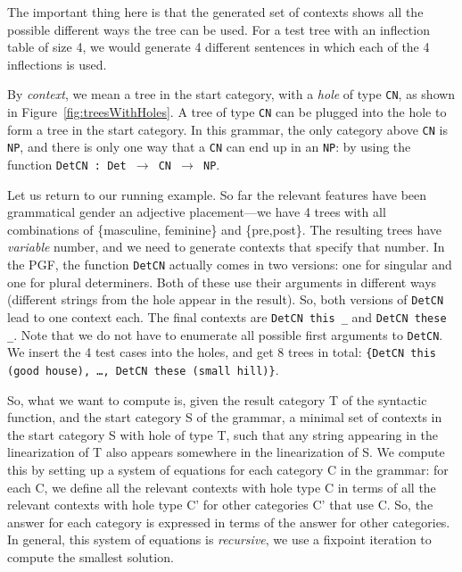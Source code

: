 \documentclass[11pt]{article}
\def\t#1{\texttt{#1}}
\begin{document}
The important thing here is that the generated set of contexts shows all the possible different ways the tree can be used. For a test tree with an inflection table of size 4, we would generate 4 different sentences in which each of the 4 inflections is used.

By \emph{context}, we mean a tree in
the start category, with a \emph{hole} of type \t{CN}, as shown in
Figure~\ref{fig:treesWithHoles}. A tree of type \t{CN} can be plugged into the hole to form a tree in the start category. In this grammar, the only category above \t{CN} is \t{NP}, and there is only
one way that a \t{CN} can end up in an \t{NP}: by using the function
\t{DetCN : Det $\rightarrow$ CN $\rightarrow$ NP}. 

Let us return to our running example. So far the relevant features have
been grammatical gender an adjective placement---we have 4 trees with
all combinations of \{masculine, feminine\} and \{pre,post\}. The
resulting trees have \emph{variable} number, and we need to generate contexts that specify that number. In the PGF, the function \t{DetCN} actually comes in two versions: one for singular and one for plural determiners. Both of these use their arguments in different ways (different strings from the hole appear in the result). So, both versions of \t{DetCN} lead to one context each. The final contexts are \verb|DetCN this _| and  \verb|DetCN these _|. Note that we do not have to enumerate all possible first arguments to \t{DetCN}. We insert the 4 test
cases into the holes, and get 8 trees in total: \t{\{DetCN this (good
  house), \dots, DetCN these (small hill)\}}. 

So, what we want to compute is, given the result category T of the syntactic function, and the start category S of the grammar, a minimal set of contexts in the start category S with hole of type T, such that any string appearing in the linearization of T also appears somewhere in the linearization of S. We compute this by setting up a system of equations for each category C in the grammar: for each C, we define all the relevant contexts with hole type C in terms of all the relevant contexts with hole type C' for other categories C' that use C. So, the answer for each category is expressed in terms of the answer for other categories. In general, this system of equations is \emph{recursive}, we use a fixpoint iteration to compute the smallest solution.
\end{document}
